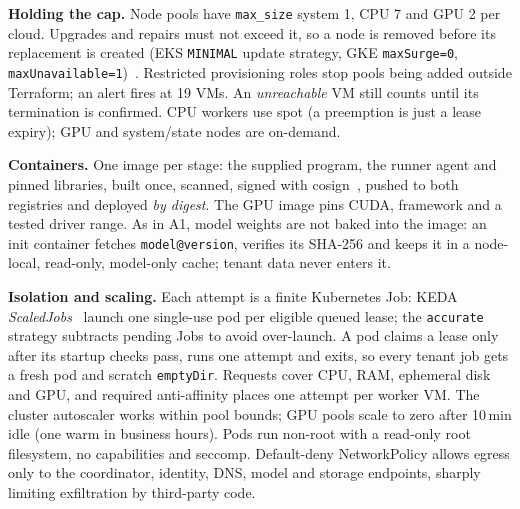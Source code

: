 \documentclass[10pt,a4paper]{article}
\begin{document}
\textbf{Holding the cap.} Node pools have \texttt{max\_size} system 1, CPU 7 and GPU 2 per cloud. Upgrades
and repairs must not exceed it, so a node is removed before its replacement is created (EKS
\texttt{MINIMAL} update strategy, GKE \texttt{maxSurge=0}, \texttt{maxUnavailable=1})~\cite{eks-update,gke-upgrade}. Restricted provisioning roles stop pools
being added outside Terraform; an alert fires at 19 VMs. An \emph{unreachable} VM still counts until its
termination is confirmed. CPU workers use spot (a preemption is just a lease expiry); GPU and system/state
nodes are on-demand.

\textbf{Containers.} One image per stage: the supplied program, the runner agent and pinned libraries, built
once, scanned, signed with cosign~\cite{cosign}, pushed to both registries and deployed \emph{by digest}. The
GPU image pins CUDA, framework and a tested driver range. As in A1, model weights are not baked into the
image: an init container fetches \texttt{model@version}, verifies its SHA-256 and keeps it in a node-local,
read-only, model-only cache; tenant data never enters it.

\textbf{Isolation and scaling.} Each attempt is a finite Kubernetes Job: KEDA \emph{ScaledJobs}~\cite{keda}
launch one single-use pod per eligible queued lease; the \texttt{accurate} strategy subtracts pending Jobs to avoid over-launch. A pod
claims a lease only after its startup checks pass, runs one attempt and exits, so every tenant job gets
a fresh pod and scratch \texttt{emptyDir}. Requests cover CPU, RAM, ephemeral disk and GPU, and required
anti-affinity places one attempt per worker VM. The cluster autoscaler works within pool bounds; GPU pools
scale to zero after 10\,min idle (one warm in business hours). Pods run non-root with a read-only root
filesystem, no capabilities and seccomp. Default-deny NetworkPolicy allows egress only to the
coordinator, identity, DNS, model and storage endpoints, sharply limiting exfiltration by third-party code.

\end{document}
